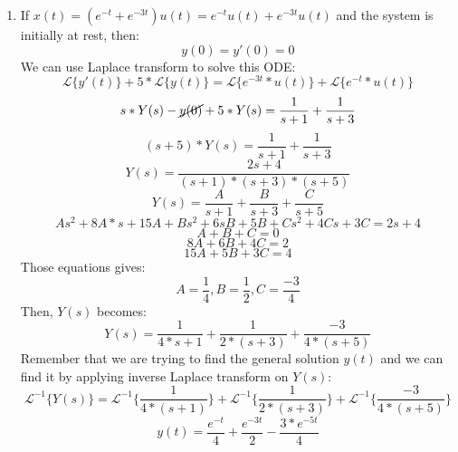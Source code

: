 \documentclass[10pt,a4paper, margin=1in]{article}
\begin{document}
\begin{enumerate}
\begin{enumerate}
    \item %
If $x(t) = (e^{-t} + e^{-3t})u(t) =e^{-t}u(t) + e^{-3t}u(t)$ and the system is initially at rest, then:
\begin{equation*}
    y(0) = y'(0) = 0
\end{equation*}
    We can use Laplace transform to solve this ODE:
    \begin{equation*}
        \mathscr{L}\{y'(t)\} + 5 * \mathscr{L}\{y(t)\}=\mathscr{L}\{e^{-3t}*u(t)\} + \mathscr{L}\{e^{-t}*u(t)\} 
    \end{equation*}
    \begin{equation*}
        s*Y(s) - \cancel{y(0)} + 5 * Y(s) = \frac{1}{s+1} + \frac{1}{s+3}
    \end{equation*}
    \begin{equation*}
        (s+5)*Y(s) = \frac{1}{s+1} + \frac{1}{s+3}
    \end{equation*}
    \begin{equation*}
        Y(s) = \frac{2s+4}{(s+1)*(s+3)*(s+5)}
    \end{equation*}
    \begin{equation*}
        Y(s) = \frac{A}{s+1} + \frac{B}{s+3} + \frac{C}{s+5} 
    \end{equation*}
    \begin{equation*}
        As^2 + 8A*s + 15 A + Bs^2 + 6sB+5B+Cs^2+4Cs+3C = 2s+ 4
    \end{equation*}
    \begin{equation*}
        A + B + C = 0
    \end{equation*}
    \begin{equation*}
        8A + 6B + 4C = 2
    \end{equation*}
    \begin{equation*}
        15A + 5B + 3C = 4
    \end{equation*}
Those equations gives:
\begin{equation*}
    A = \frac{1}{4}, B = \frac{1}{2}, C = \frac{-3}{4}
\end{equation*}
Then,  $Y(s)$ becomes:
\begin{equation*}
    Y(s) = \frac{1}{4*s+1} + \frac{1}{2*(s+3)} + \frac{-3}{4*(s+5)}
\end{equation*}
Remember that we are trying to find the general solution $y(t)$ and we can find it by applying inverse Laplace transform on $Y(s)$:
\begin{equation*}
    \mathscr{L^{-1}}\{Y(s)\} = \mathscr{L^{-1}}\{\frac{1}{4*(s+1)}\} + \mathscr{L^{-1}}\{\frac{1}{2*(s+3)}\} +\mathscr{L^{-1}}\{\frac{-3}{4*(s+5)}\}
\end{equation*}
\begin{equation}
    y(t) = \frac{e^{-t}}{4} + \frac{e^{-3t}}{2} - \frac{3*e^{-5t}}{4}
\end{equation}
    \end{enumerate}


\end{enumerate}
\end{document}
